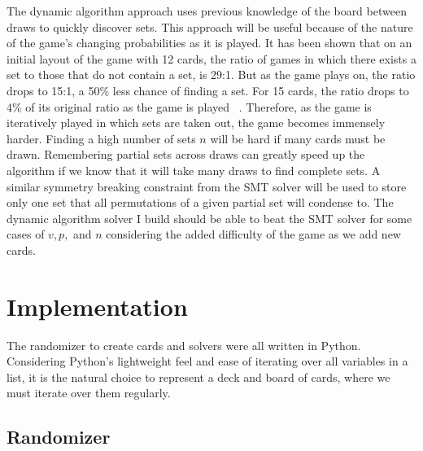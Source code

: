\documentclass[pageno]{jpaper}
\begin{document}
The dynamic algorithm approach uses previous knowledge of the board between draws to quickly discover sets. This approach will be useful because of the nature of the game's changing probabilities as it is played. It has been shown that on an initial layout of the game with 12 cards, the ratio of games in which there exists a set to those that do not contain a set, is 29:1. But as the game plays on, the ratio drops to 15:1, a 50\% less chance of finding a set. For 15 cards, the ratio drops to 4\% of its original ratio as the game is played ~\cite{norvig}. Therefore, as the game is iteratively played in which sets are taken out, the game becomes immensely harder. Finding a high number of sets $n$ will be hard if many cards must be drawn. Remembering partial sets across draws can greatly speed up the algorithm if we know that it will take many draws to find complete sets. A similar symmetry breaking constraint from the SMT solver will be used to store only one set that all permutations of a given partial set will condense to. The dynamic algorithm solver I build should be able to beat the SMT solver for some cases of $v,p,$ and $n$ considering the added difficulty of the game as we add new cards.

\section{Implementation}

The randomizer to create cards and solvers were all written in Python. Considering Python's lightweight feel and ease of iterating over all variables in a list, it is the natural choice to represent a deck and board of cards, where we must iterate over them regularly.


\subsection{Randomizer}
\end{document}
